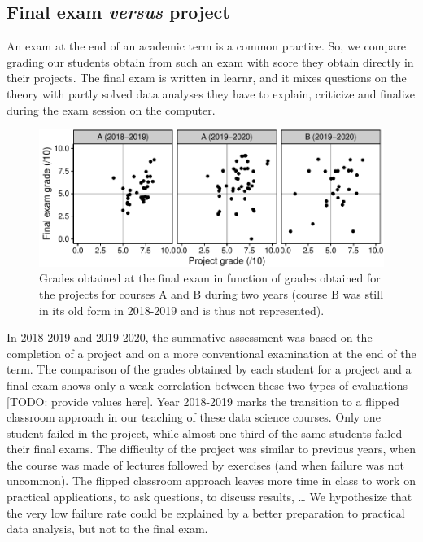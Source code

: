 \documentclass{aims}
\theoremstyle{definition}
\begin{document}
\hypertarget{final-exam-versus-project}{%
\subsection{\texorpdfstring{Final exam \emph{versus}
project}{Final exam versus project}}\label{final-exam-versus-project}}

An exam at the end of an academic term is a common practice. So, we
compare grading our students obtain from such an exam with score they
obtain directly in their projects. The final exam is written in learnr,
and it mixes questions on the theory with partly solved data analyses
they have to explain, criticize and finalize during the exam session on
the computer.

\begin{figure}
\includegraphics[width=1\linewidth]{teaching_data_science_files/figure-latex/fig_exams_projects-1} \caption{\label{fig:fig_exams_projects}  Grades obtained at the final exam in function of grades obtained for the projects for courses A and B during two years (course B was still in its old form in 2018-2019 and is thus not represented).}\label{fig:fig_exams_projects}
\end{figure}

In 2018-2019 and 2019-2020, the summative assessment was based on the
completion of a project and on a more conventional examination at the
end of the term. The comparison of the grades obtained by each student
for a project and a final exam shows only a weak correlation between
these two types of evaluations {[}TODO: provide values here{]}. Year
2018-2019 marks the transition to a flipped classroom approach in our
teaching of these data science courses. Only one student failed in the
project, while almost one third of the same students failed their final
exams. The difficulty of the project was similar to previous years, when
the course was made of lectures followed by exercises (and when failure
was not uncommon). The flipped classroom approach leaves more time in
class to work on practical applications, to ask questions, to discuss
results, \ldots{} We hypothesize that the very low failure rate could be
explained by a better preparation to practical data analysis, but not to
the final exam.
\end{document}
